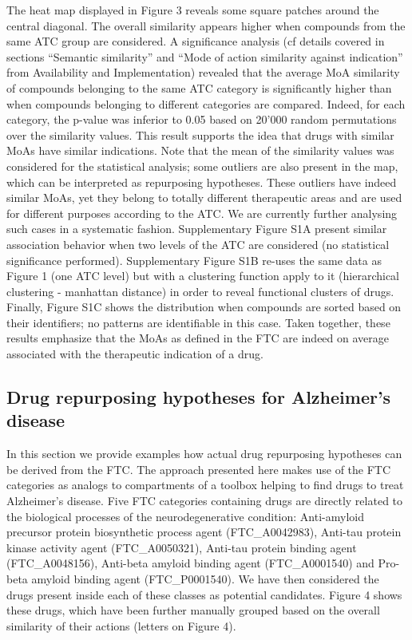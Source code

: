 \documentclass{bioinfo}
\begin{document}
The heat map displayed in Figure 3 reveals some square patches around the central diagonal. 
The overall similarity appears higher when compounds from the same ATC group are considered. 
A significance analysis (cf details covered in sections “Semantic similarity” 
and “Mode of action similarity against indication” from Availability and Implementation) 
revealed that the average MoA similarity of compounds belonging to the same ATC category is 
significantly higher than when compounds belonging to different categories are compared. Indeed, for 
each category, the p-value was inferior to 0.05 based on 20'000 random permutations over the similarity values. 
This result supports the idea that drugs with similar MoAs have similar indications. Note that the mean of the 
similarity values was considered for the statistical analysis; some outliers are also present in the map, which 
can be interpreted as repurposing hypotheses. These outliers have indeed similar MoAs, yet they belong to totally 
different therapeutic areas and are used for different purposes according to the ATC. We are currently further analysing 
such cases in a systematic fashion. Supplementary Figure S1A present similar association behavior when two levels of the ATC are 
considered (no statistical significance performed). Supplementary Figure S1B re-uses the same data as Figure 1 (one ATC level) 
but with a clustering function apply to it (hierarchical clustering - manhattan distance) in order to reveal 
functional clusters of drugs. Finally, Figure S1C shows the distribution when compounds are sorted based on 
their identifiers; no patterns are identifiable in this case. Taken together, these results emphasize that the MoAs as 
defined in the FTC are indeed on average associated with the therapeutic indication of a drug.
 
\subsection{Drug repurposing hypotheses for Alzheimer’s disease}
In this section we provide examples how actual drug repurposing hypotheses can be derived from the FTC. 
The approach presented here makes use of the FTC categories as analogs to compartments of a toolbox helping to 
find drugs to treat Alzheimer’s disease. Five FTC categories containing drugs are directly related to the biological 
processes of the neurodegenerative condition: Anti-amyloid precursor protein biosynthetic process agent (FTC\_A0042983), 
Anti-tau protein kinase activity agent (FTC\_A0050321), Anti-tau protein binding agent (FTC\_A0048156), Anti-beta amyloid 
binding agent (FTC\_A0001540) and Pro-beta amyloid binding agent (FTC\_P0001540). We have then considered the drugs present 
inside each of these classes as potential candidates. Figure 4 shows these drugs, which have been further manually grouped 
based on the overall similarity of their actions (letters on Figure 4).
\end{document}
